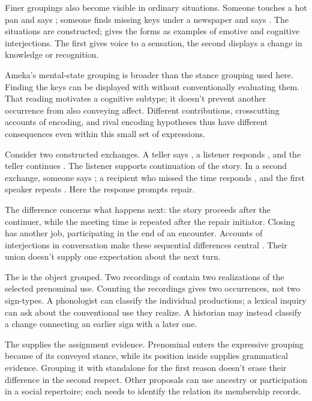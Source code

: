 Finer groupings also become visible in ordinary situations. Someone
touches a hot pan and says ; someone finds missing keys
under a newspaper and says . The situations are constructed;
\textcite[113]{ameka1992} gives the forms as examples of emotive and
cognitive interjections. The first gives voice to a sensation, the
second displays a change in knowledge or recognition.

Ameka's mental-state grouping is broader than the stance grouping used
here. Finding the keys can be displayed with  without
conventionally evaluating them. That reading motivates a cognitive subtype;
it doesn't prevent another occurrence from also conveying affect.
Different contributions, crosscutting accounts of encoding, and rival
encoding hypotheses thus have different consequences even within this
small set of expressions.

Consider two constructed exchanges. A teller says , a listener responds , and the teller continues
. The listener supports continuation of the
story. In a second exchange, someone says ;
a recipient who missed the time responds , and the first
speaker repeats . Here the response prompts repair.

The difference concerns what happens next: the story proceeds after
the continuer, while the meeting time is repeated after the repair
initiator. Closing  has another job, participating in the
end of an encounter. Accounts of interjections in conversation make
these sequential differences central \citep[257--259, 263--265]{dingemanse2024}.
Their union doesn't supply one expectation about the next turn.

The  is the object grouped. Two recordings of  contain two realizations of the selected prenominal
 use. Counting the recordings gives two occurrences, not
two sign-types. A phonologist can classify the individual productions;
a lexical inquiry can ask about the conventional use they realize.
A historian may instead classify a change connecting an earlier sign
with a later one.

The  supplies the assignment evidence. Prenominal
 enters the expressive grouping because of its conveyed
stance, while its position inside  supplies
grammatical evidence. Grouping it with standalone  for
the first reason doesn't erase their difference in the second respect.
Other proposals can use ancestry or participation in a social repertoire;
each needs to identify the relation its membership records.


